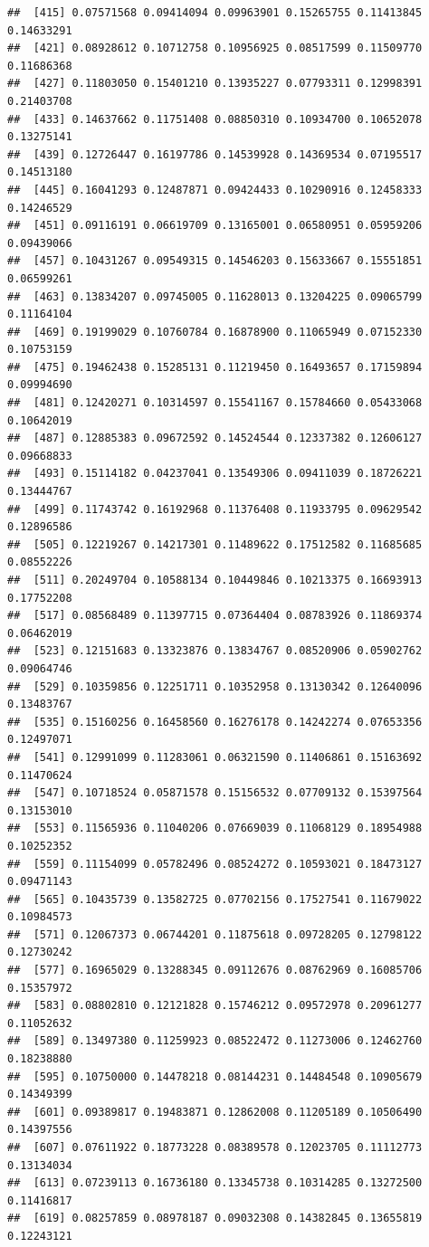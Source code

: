 \documentclass[
]{article}
\begin{document}
\begin{verbatim}
##  [415] 0.07571568 0.09414094 0.09963901 0.15265755 0.11413845 0.14633291
##  [421] 0.08928612 0.10712758 0.10956925 0.08517599 0.11509770 0.11686368
##  [427] 0.11803050 0.15401210 0.13935227 0.07793311 0.12998391 0.21403708
##  [433] 0.14637662 0.11751408 0.08850310 0.10934700 0.10652078 0.13275141
##  [439] 0.12726447 0.16197786 0.14539928 0.14369534 0.07195517 0.14513180
##  [445] 0.16041293 0.12487871 0.09424433 0.10290916 0.12458333 0.14246529
##  [451] 0.09116191 0.06619709 0.13165001 0.06580951 0.05959206 0.09439066
##  [457] 0.10431267 0.09549315 0.14546203 0.15633667 0.15551851 0.06599261
##  [463] 0.13834207 0.09745005 0.11628013 0.13204225 0.09065799 0.11164104
##  [469] 0.19199029 0.10760784 0.16878900 0.11065949 0.07152330 0.10753159
##  [475] 0.19462438 0.15285131 0.11219450 0.16493657 0.17159894 0.09994690
##  [481] 0.12420271 0.10314597 0.15541167 0.15784660 0.05433068 0.10642019
##  [487] 0.12885383 0.09672592 0.14524544 0.12337382 0.12606127 0.09668833
##  [493] 0.15114182 0.04237041 0.13549306 0.09411039 0.18726221 0.13444767
##  [499] 0.11743742 0.16192968 0.11376408 0.11933795 0.09629542 0.12896586
##  [505] 0.12219267 0.14217301 0.11489622 0.17512582 0.11685685 0.08552226
##  [511] 0.20249704 0.10588134 0.10449846 0.10213375 0.16693913 0.17752208
##  [517] 0.08568489 0.11397715 0.07364404 0.08783926 0.11869374 0.06462019
##  [523] 0.12151683 0.13323876 0.13834767 0.08520906 0.05902762 0.09064746
##  [529] 0.10359856 0.12251711 0.10352958 0.13130342 0.12640096 0.13483767
##  [535] 0.15160256 0.16458560 0.16276178 0.14242274 0.07653356 0.12497071
##  [541] 0.12991099 0.11283061 0.06321590 0.11406861 0.15163692 0.11470624
##  [547] 0.10718524 0.05871578 0.15156532 0.07709132 0.15397564 0.13153010
##  [553] 0.11565936 0.11040206 0.07669039 0.11068129 0.18954988 0.10252352
##  [559] 0.11154099 0.05782496 0.08524272 0.10593021 0.18473127 0.09471143
##  [565] 0.10435739 0.13582725 0.07702156 0.17527541 0.11679022 0.10984573
##  [571] 0.12067373 0.06744201 0.11875618 0.09728205 0.12798122 0.12730242
##  [577] 0.16965029 0.13288345 0.09112676 0.08762969 0.16085706 0.15357972
##  [583] 0.08802810 0.12121828 0.15746212 0.09572978 0.20961277 0.11052632
##  [589] 0.13497380 0.11259923 0.08522472 0.11273006 0.12462760 0.18238880
##  [595] 0.10750000 0.14478218 0.08144231 0.14484548 0.10905679 0.14349399
##  [601] 0.09389817 0.19483871 0.12862008 0.11205189 0.10506490 0.14397556
##  [607] 0.07611922 0.18773228 0.08389578 0.12023705 0.11112773 0.13134034
##  [613] 0.07239113 0.16736180 0.13345738 0.10314285 0.13272500 0.11416817
##  [619] 0.08257859 0.08978187 0.09032308 0.14382845 0.13655819 0.12243121

\end{verbatim}
\end{document}
